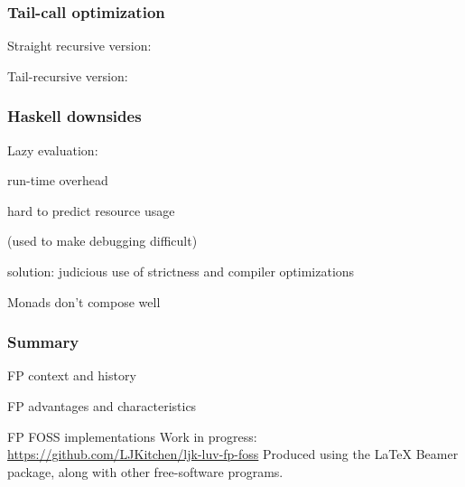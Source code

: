 \begin{frame}
\frametitle{Tail-call optimization}
Straight recursive version:

Tail-recursive version:

\end{frame}

\begin{frame}
\frametitle{Haskell downsides}
\bi
\item Lazy evaluation:
\bi
\item run-time overhead
\item hard to predict resource usage
\item (used to make debugging difficult)
\item solution: judicious use of strictness and compiler optimizations
\ei
\item Monads don't compose well
\ei
\end{frame}

\begin{frame}
\frametitle{Summary}
\bi
\item FP context and history
\item FP advantages and characteristics
\item FP FOSS implementations
\ei
Work in progress: \\
{\small \url{https://github.com/LJKitchen/ljk-luv-fp-foss}}
\medskip
{\scriptsize Produced using the {\LaTeX} Beamer package, along
  with other free-software programs.}
\end{frame}


